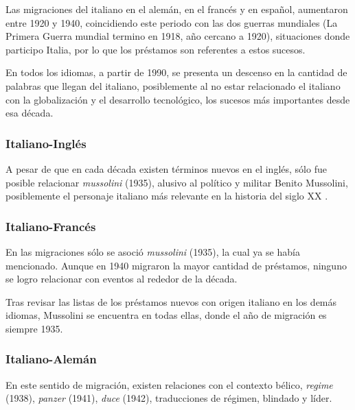 Las migraciones del italiano en el alemán, en el francés y en español, aumentaron  entre 1920 y 1940,  coincidiendo este periodo con las dos guerras mundiales (La Primera Guerra mundial termino en 1918, año cercano a 1920), situaciones donde participo Italia, por lo que los préstamos son referentes a estos  sucesos. 

En todos los idiomas,  a partir de 1990, se presenta un descenso en la cantidad de palabras que llegan del italiano, posiblemente al no estar relacionado el italiano con la globalización y el desarrollo tecnológico, los sucesos más importantes  desde esa década.   

\subsubsection*{Italiano-Inglés}%

A pesar de que en cada década existen términos nuevos en el inglés, sólo fue posible relacionar \textit{mussolini} (1935),  alusivo al político y militar Benito Mussolini,  posiblemente el personaje italiano más relevante en la historia del siglo XX .

\subsubsection*{Italiano-Francés}%



En las migraciones sólo se asoció \textit{mussolini} (1935), la cual ya se había mencionado. Aunque en 1940 migraron la mayor cantidad de préstamos, ninguno se logro relacionar con eventos al rededor de la década. 

Tras revisar las listas de los préstamos nuevos con origen italiano  en los demás idiomas, Mussolini se encuentra en todas ellas, donde el año de migración es siempre 1935.





\subsubsection*{Italiano-Alemán}%

En este sentido de migración,  existen relaciones con el contexto bélico,  \textit{regime} (1938), \textit{panzer} (1941), \textit{duce} (1942),  traducciones de régimen, blindado y líder.




